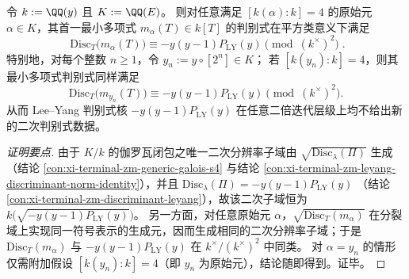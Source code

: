 \begin{conclusion}\label{con:xi-terminal-zm-discriminant-squarefree-class-primitive-element}
令 \(k:=\QQ(y)\) 且 \(K:=\QQ(E)\)。
则对任意满足 \([k(\alpha):k]=4\) 的原始元 \(\alpha\in K\)，其首一最小多项式 \(m_{\alpha}(T)\in k[T]\) 的判别式在平方类意义下满足
\[
\boxed{\;
\mathrm{Disc}_{T}\bigl(m_{\alpha}(T)\bigr)\equiv -y(y-1)P_{\mathrm{LY}}(y)\pmod{(k^{\times})^{2}}\; }.
\]
特别地，对每个整数 \(n\ge 1\)，令 \(y_{n}:=y\circ[2^{n}]\in K\)；
若 \([k(y_{n}):k]=4\)，则其最小多项式判别式同样满足
\[
\mathrm{Disc}_{T}\bigl(m_{y_{n}}(T)\bigr)\equiv -y(y-1)P_{\mathrm{LY}}(y)\pmod{(k^{\times})^{2}}.
\]
从而 Lee--Yang 判别式核 \(-y(y-1)P_{\mathrm{LY}}(y)\) 在任意二倍迭代层级上均不给出新的二次判别式数据。
\end{conclusion}
\begin{proof}[证明要点]
由于 \(K/k\) 的伽罗瓦闭包之唯一二次分辨率子域由 \(\sqrt{\mathrm{Disc}_{\lambda}(\Pi)}\) 生成（结论 \ref{con:xi-terminal-zm-generic-galois-s4} 与结论 \ref{con:xi-terminal-zm-leyang-discriminant-norm-identity}），并且
\(
\mathrm{Disc}_{\lambda}(\Pi)=-y(y-1)P_{\mathrm{LY}}(y)
\)
（结论 \ref{con:xi-terminal-zm-discriminant-leyang}），故该二次子域恒为
\(
k\bigl(\sqrt{-y(y-1)P_{\mathrm{LY}}(y)}\bigr)
\)。
另一方面，对任意原始元 \(\alpha\)，\(\sqrt{\mathrm{Disc}_{T}(m_{\alpha})}\) 在分裂域上实现同一符号表示的生成元，因而生成相同的二次分辨率子域；于是 \(\mathrm{Disc}_{T}(m_{\alpha})\) 与 \(-y(y-1)P_{\mathrm{LY}}(y)\) 在 \(k^{\times}/(k^{\times})^{2}\) 中同类。
对 \(\alpha=y_{n}\) 的情形仅需附加假设 \([k(y_{n}):k]=4\)（即 \(y_{n}\) 为原始元），结论随即得到。证毕。
\end{proof}

